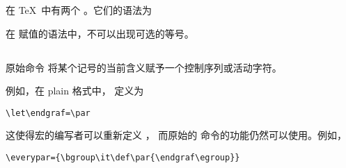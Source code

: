 \documentclass[letterpaper]{book}
\begin{document}
在 \TeX\ 中有两个 。它们的语法为
\begin{disp}%
     \nl
     \end{disp}
在  赋值的语法中，不可以出现可选的等号。

\subsection{\protect{}}
\label{let}

原始命令  将某个记号的当前含义赋予一个控制序列或活动字符。

例如，在 plain 格式中， 定义为
\begin{verbatim}
\let\endgraf=\par
\end{verbatim}
这使得宏的编写者可以重新定义 ，
而原始的  命令的功能仍然可以使用。例如，
\begin{verbatim}
\everypar={\bgroup\it\def\par{\endgraf\egroup}}
\end{verbatim}
\end{document}
